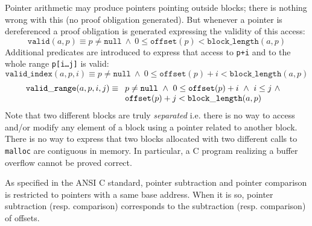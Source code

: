 \documentclass[12pt,a4paper,twoside,openright]{report}
\begin{document}
Pointer arithmetic may produce pointers pointing outside blocks; there
is nothing wrong with this (no proof obligation generated). But
whenever a pointer is dereferenced a proof obligation is generated
expressing the validity of this access:
\begin{displaymath}
  \mathtt{valid}(a,p) \equiv p\not=\mathtt{null} ~ \land ~ 
    0 \le \mathtt{offset}(p) < \mathtt{block\_length}(a,p)
\end{displaymath}
Additional predicates are introduced to express that access to
\texttt{p+i} and to the whole range \texttt{p[i\dots j]} is valid:
\begin{displaymath}
  \mathtt{valid\_index}(a,p,i) \equiv p\not=\mathtt{null} ~ \land ~ 
    0 \le \mathtt{offset}(p)+i < \mathtt{block\_length}(a,p)
\end{displaymath}
\begin{displaymath}
  \mathtt{valid\_range}(a,p,i,j) \equiv 
  \begin{array}[t]{l}
    p\not=\mathtt{null} ~ \land ~ 
    0 \le \mathtt{offset}(p)+i ~\land~ i\le j ~\land~ \\
    \mathtt{offset}(p)+j < \mathtt{block\_length}(a,p)
  \end{array}
\end{displaymath}
Note that two different blocks are truly \emph{separated} i.e. there
is no way to access and/or modify any element of a block using a
pointer related to another block. There is no way to
express that two blocks allocated with two different calls to
\texttt{malloc} are contiguous in memory. In particular, a C program
realizing a buffer overflow cannot be proved correct.

\medskip

As specified in the ANSI C standard, pointer subtraction and pointer
comparison is restricted to pointers with a same base address.
When it is so, pointer subtraction (resp. comparison) corresponds to
the subtraction (resp. comparison) of offsets.

\medskip
\end{document}
